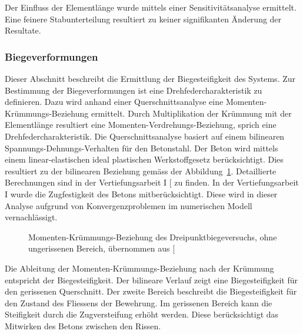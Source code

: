 \documentclass[
  11pt,
  letterpaper,
]{scrreprt}
\begin{document}
Der Einfluss der Elementlänge wurde mittels einer Sensitivitätsanalyse
ermittelt. Eine feinere Stabunterteilung resultiert zu keiner
signifikanten Änderung der Resultate.

\subsubsection{Biegeverformungen}\label{biegeverformungen}

Dieser Abschnitt beschreibt die Ermittlung der Biegesteifigkeit des
Systems. Zur Bestimmung der Biegeverformungen ist eine
Drehfedercharakteristik zu definieren. Dazu wird anhand einer
Querschnittsanalyse eine Momenten-Krümmungs-Beziehung ermittelt. Durch
Multiplikation der Krümmung mit der Elementlänge resultiert eine
Momenten-Verdrehungs-Beziehung, sprich eine Drehfedercharakteristik. Die
Querschnittsanalyse basiert auf einem bilinearen
Spannungs-Dehnungs-Verhalten für den Betonstahl. Der Beton wird mittels
einem linear-elastischen ideal plastischen Werkstoffgesetz
berücksichtigt. Dies resultiert zu der bilinearen Beziehung gemäss der
Abbildung~\ref{fig-mchi_a3v2}. Detaillierte Berechnungen sind in der
Vertiefungsarbeit I {[}\citeproc{ref-gitz_ansatze_2024}{1}{]} zu finden.
In der Vertiefungsarbeit I wurde die Zugfestigkeit des Betons
mitberücksichtigt. Diese wird in dieser Analyse aufgrund von
Konvergenzproblemen im numerischen Modell vernachlässigt.

\begin{figure}[H]


\caption{\label{fig-mchi_a3v2}Momenten-Krümmungs-Beziehung des
Dreipunktbiegeversuchs, ohne ungerissenen Bereich, übernommen aus
{[}\citeproc{ref-gitz_ansatze_2024}{1}{]}}

\end{figure}%

Die Ableitung der Momenten-Krümmungs-Beziehung nach der Krümmung
entspricht der Biegesteifigkeit. Der bilineare Verlauf zeigt eine
Biegesteifigkeit für den gerissenen Querschnitt. Der zweite Bereich
beschreibt die Biegesteifigkeit für den Zustand des Fliessens der
Bewehrung. Im gerissenen Bereich kann die Steifigkeit durch die
Zugversteifung erhöht werden. Diese berücksichtigt das Mitwirken des
Betons zwischen den Rissen.
\end{document}
